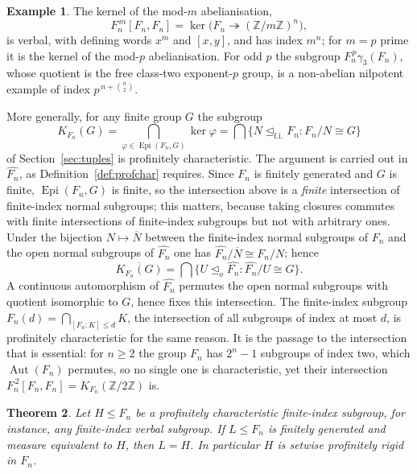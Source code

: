 \documentclass[11pt]{amsart}
\theoremstyle{plain}
\newtheorem{theorem}{Theorem}[section]
\theoremstyle{definition}
\newtheorem{example}[theorem]{Example}
\newcommand{\Epi}{\operatorname{Epi}}
\newcommand{\Aut}{\operatorname{Aut}}
\newcommand{\fii}{\trianglelefteq_{\mathrm{f.i.}}}
\begin{document}
\begin{example}\label{ex:verbal}
The kernel of the mod-$m$ abelianisation,
\[
  F_n^{\,m}[F_n,F_n]=\ker\bigl(F_n\twoheadrightarrow(\mathbb Z/m\mathbb Z)^{n}\bigr),
\]
is verbal, with defining words $x^{m}$ and $[x,y]$, and has index $m^{n}$; for
$m=p$ prime it is the kernel of the mod-$p$ abelianisation.  For odd $p$ the
subgroup $F_n^{\,p}\gamma_3(F_n)$, whose quotient is the free class-two exponent-$p$
group, is a non-abelian nilpotent example of index $p^{\,n+\binom n2}$.

More generally, for any finite group $G$ the subgroup
\[
  K_{F_n}(G)=\bigcap_{\varphi\in\Epi(F_n,G)}\ker\varphi
  =\bigcap\{N\fii F_n : F_n/N\cong G\}
\]
of Section~\ref{sec:tuples} is profinitely characteristic.  The argument is
carried out in $\widehat{F_n}$, as Definition~\ref{def:profchar} requires.  Since
$F_n$ is finitely generated and $G$ is finite, $\Epi(F_n,G)$ is finite, so the
intersection above is a \emph{finite} intersection of finite-index normal
subgroups; this matters, because taking closures commutes with finite
intersections of finite-index subgroups but not with arbitrary ones.  Under
the bijection $N\mapsto\overline N$ between the finite-index normal subgroups of
$F_n$ and the open normal subgroups of $\widehat{F_n}$ one has
$\widehat{F_n}/\overline N\cong F_n/N$; hence
\[
  \overline{K_{F_n}(G)}=\bigcap\{U\trianglelefteq_{o}\widehat{F_n}
    :\widehat{F_n}/U\cong G\}.
\]
A continuous automorphism of $\widehat{F_n}$ permutes the open normal subgroups
with quotient isomorphic to $G$, hence fixes this intersection.  The finite-index
subgroup $F_n(d)=\bigcap_{[F_n:K]\le d}K$, the intersection of all subgroups of
index at most $d$, is profinitely characteristic for the same reason.  It is the
passage to the intersection that is essential: for $n\ge2$ the
group $F_n$ has $2^{n}-1$ subgroups of index two, which $\Aut(F_n)$ permutes, so
no single one is characteristic, yet their intersection
$F_n^{\,2}[F_n,F_n]=K_{F_n}(\mathbb Z/2\mathbb Z)$ is.
\end{example}

\begin{theorem}\label{thm:measure-detected}
Let $H\le F_n$ be a profinitely characteristic finite-index subgroup, for
instance, any finite-index verbal subgroup.  If $L\le F_n$ is finitely generated
and measure equivalent to $H$, then $L=H$.  In particular $H$ is setwise
profinitely rigid in $F_n$.
\end{theorem}
\end{document}
